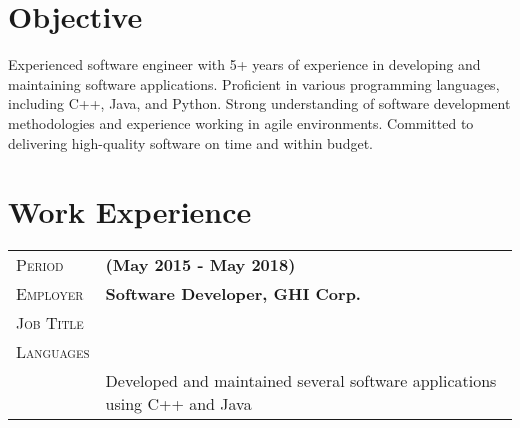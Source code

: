\documentclass[a4paper, oneside, final]{scrartcl} %
\newcommand{\gray}{\rowcolor[gray]{.90}} %
\begin{document}
\begin{center} %


{\fontsize{36}{36}\selectfont\scshape{}} %

\vspace{1.5cm} %


\section{Objective}

 Experienced software engineer with 5+ years of experience in developing and maintaining software applications. Proficient in various programming languages, including C++, Java, and Python. Strong understanding of software development methodologies and experience working in agile environments. Committed to delivering high-quality software on time and within budget.


\section{Work Experience}

\begin{tabularx}{0.97\linewidth}{>{\raggedleft\scshape}p{2cm}X}
\gray Period & \textbf{(May 2015 - May 2018)}\\
\gray Employer & \textbf{Software Developer, GHI Corp.} \hfill  \\
\gray Job Title & \textbf{}\\
\gray Languages & \textbf{ }\\
       & Developed and maintained several software applications using C++ and Java
\end{tabularx}

\vspace{12pt}


\end{center}
\end{document}
